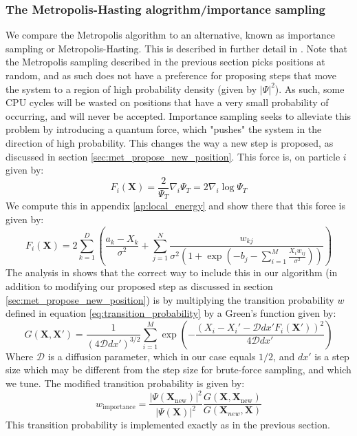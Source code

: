 \documentclass[a4paper, 10pt]{article}
\begin{document}
	\subsubsection{The Metropolis-Hasting alogrithm/importance sampling}
	We compare the Metropolis algorithm to an alternative, known as importance sampling or Metropolis-Hasting. This is described in further detail in \cite{Hjorth-Jensen2015}. Note that the Metropolis sampling described in the previous section picks positions at random, and as such does not have a preference for proposing steps that move the system to a region of high probability density (given by $|\Psi|^2$). As such, some CPU cycles will be wasted on positions that have a very small probability of occurring, and will never be accepted. Importance sampling seeks to alleviate this problem by introducing a quantum force, which "pushes" the system in the direction of high probability. This changes the way a new step is proposed, as discussed in section \ref{sec:met_propose_new_position}. This force is, on particle $i$ given by:
	\begin{equation}
	F_i(\boldsymbol{X})=\frac{2}{\Psi_T}\nabla_i \Psi_T=2\nabla_i \log \Psi_T
	\end{equation}
	We compute this in appendix \ref{ap:local_energy} and show there that this force is given by:
	\begin{equation}\label{eq:quantum_force}
	F_i(\boldsymbol{X})=2\sum_{k=1}^D \left(\frac{a_k-X_k}{\sigma^2}+\sum_{j=1}^N \frac{w_{kj}}{\sigma^2 \left(1+ \exp \left(-b_j-\sum_{i=1}^{M} \frac{X_iw_{ij}}{\sigma^2}\right)\right)}\right)
	\end{equation}
	The analysis in \cite{Hjorth-Jensen2015} shows that the correct way to include this in our algorithm (in addition to modifying our proposed step as discussed in section \ref{sec:met_propose_new_position}) is by multiplying the transition probability $w$ defined in equation \ref{eq:transition_probability} by a Green's function given by:
	\begin{equation}
	G(\mathbf{X}, \mathbf{X}')=\frac{1}{(4\mathcal{D}dx')^{3/2}}\sum_{i=1}^M \exp \left(-\frac{(X_i-X_i'-\mathcal{D}dx' F_i(\mathbf{X}'))^2}{4\mathcal{D} dx'}\right)
	\end{equation}
	Where $\mathcal{D}$ is a diffusion parameter, which in our case equals $1/2$, and $dx'$ is a step size which may be different from the step size for brute-force sampling, and which we tune. The modified transition probability is given by:
	\begin{equation}
	w_{\mathrm{importance}}=\frac{|\Psi(\boldsymbol{X}_{\mathrm{new}})|^2}{|\Psi(\boldsymbol{X})|^2}\frac{G(\boldsymbol{X}, \boldsymbol{X}_{\mathrm{new}})}{G(\boldsymbol{X}_{new}, \boldsymbol{X})}
	\end{equation}
	This transition probability is implemented exactly as in the previous section. 
\end{document}

